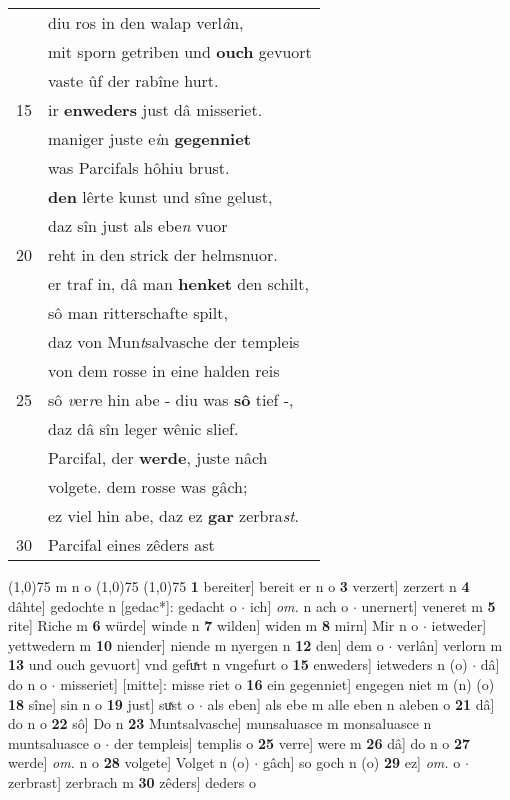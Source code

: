 \documentclass[8pt,a4paper,notitlepage]{article}
\begin{document}
\begin{table}[ht]
\begin{minipage}[t]{0.5\linewidth}
\begin{tabular}{rl}
 & diu ros in den walap verl\textit{â}n,\\ 
 & mit sporn getriben und \textbf{ouch} gevuort\\ 
 & vaste ûf der rabîne hurt.\\ 
15 & ir \textbf{enweders} just dâ misseriet.\\ 
 & maniger juste e\textit{i}n \textbf{gegenniet}\\ 
 & was Parcifals hôhiu brust.\\ 
 & \textbf{den} lêrte kunst und sîne gelust,\\ 
 & daz sîn just als ebe\textit{n} vuor\\ 
20 & reht in den strick der helmsnuor.\\ 
 & er traf in, dâ man \textbf{henket} den schilt,\\ 
 & sô man ritterschafte spilt,\\ 
 & daz von Mun\textit{t}salvasche der templeis\\ 
 & von dem rosse in eine halden reis\\ 
25 & sô \textit{v}er\textit{r}e hin abe - diu was \textbf{sô} tief -,\\ 
 & daz dâ sîn leger wênic slief.\\ 
 & Parcifal, der \textbf{werde}, juste nâch\\ 
 & volgete. dem rosse was gâch;\\ 
 & ez viel hin abe, daz ez \textbf{gar} zerbra\textit{st}.\\ 
30 & Parcifal eines zêders ast\\ 
\end{tabular}
\scriptsize
\line(1,0){75} \newline
m n o \newline
\line(1,0){75} \newline
\newline
\line(1,0){75} \newline
\textbf{1} bereiter] bereit er n o \textbf{3} verzert] zerzert n \textbf{4} dâhte] gedochte n [gedac*]: gedacht o  $\cdot$ ich] \textit{om.} n ach o  $\cdot$ unernert] veneret m \textbf{5} rite] Riche m \textbf{6} würde] winde n \textbf{7} wilden] widen m \textbf{8} mirn] Mir n o  $\cdot$ ietweder] yettwedern m \textbf{10} niender] niende m nyergen n \textbf{12} den] dem o  $\cdot$ verlân] verlorn m \textbf{13} und ouch gevuort] vnd gefuͯrt n vngefurt o \textbf{15} enweders] ietweders n (o)  $\cdot$ dâ] do n o  $\cdot$ misseriet] [mitte]: misse riet o \textbf{16} ein gegenniet] engegen niet m (n) (o) \textbf{18} sîne] sin n o \textbf{19} just] suͯst o  $\cdot$ als eben] als ebe m alle eben n aleben o \textbf{21} dâ] do n o \textbf{22} sô] Do n \textbf{23} Muntsalvasche] munsaluasce m monsaluasce n muntsaluasce o  $\cdot$ der templeis] templis o \textbf{25} verre] were m \textbf{26} dâ] do n o \textbf{27} werde] \textit{om.} n o \textbf{28} volgete] Volget n (o)  $\cdot$ gâch] so goch n (o) \textbf{29} ez] \textit{om.} o  $\cdot$ zerbrast] zerbrach m \textbf{30} zêders] deders o \newline
\end{minipage}
\end{table}
\end{document}
